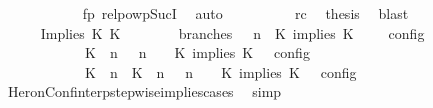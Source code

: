 \begin{isabellebody}
\ \ \ \ \ \ \ \ \ \ \isamarkupfalse%
\ fp\ relpowp{\isacharunderscore}Suc{\isacharunderscore}I{}\ \isamarkupfalse%
\ auto\isanewline
\ \ \ \ \ \ \ \ \isamarkupfalse%
\ rc\ \isamarkupfalse%
\ {\isacharquery}thesis\ \isamarkupfalse%
\ blast\isanewline
\ \ \ \ \ \ \isamarkupfalse%
\isanewline
\ \ \isamarkupfalse%
\isanewline
\ \ \ \ \isamarkupfalse%
\ {\isacharparenleft}Implies\ K\ K\isanewline
\ \ \ \ \ \ \isamarkupfalse%
\ branches{\isacharcolon}\ {\isacartoucheopen}{\isasymlbrakk}\ {\isasymGamma}{\isacharcomma}\ n\ {\isasymturnstile}\ {\isacharparenleft}{\isacharparenleft}K\ implies\ K\ {\isacharhash}\ {\isasymPsi}{\isacharparenright}\ {\isasymtriangleright}\ {\isasymPhi}\ {\isasymrbrakk}\isactrlsub c\isactrlsub o\isactrlsub n\isactrlsub f\isactrlsub i\isactrlsub g\isanewline
\ \ \ \ \ \ \ \ \ \ {\isacharequal}\ {\isasymlbrakk}\ {\isacharparenleft}{\isacharparenleft}K\ {\isasymnot}{\isasymUp}\ n{\isacharparenright}\ {\isacharhash}\ {\isasymGamma}{\isacharparenright}{\isacharcomma}\ n\ {\isasymturnstile}\ {\isasymPsi}\ {\isasymtriangleright}\ {\isacharparenleft}{\isacharparenleft}K\ implies\ K\ {\isacharhash}\ {\isasymPhi}{\isacharparenright}\ {\isasymrbrakk}\isactrlsub c\isactrlsub o\isactrlsub n\isactrlsub f\isactrlsub i\isactrlsub g\isanewline
\ \ \ \ \ \ \ \ \ \ {\isasymunion}\ {\isasymlbrakk}\ {\isacharparenleft}{\isacharparenleft}K\ {\isasymUp}\ n{\isacharparenright}\ {\isacharhash}\ {\isacharparenleft}K\ {\isasymUp}\ n{\isacharparenright}\ {\isacharhash}\ {\isasymGamma}{\isacharparenright}{\isacharcomma}\ n\ {\isasymturnstile}\ {\isasymPsi}\ {\isasymtriangleright}\ {\isacharparenleft}{\isacharparenleft}K\ implies\ K\ {\isacharhash}\ {\isasymPhi}{\isacharparenright}\ {\isasymrbrakk}\isactrlsub c\isactrlsub o\isactrlsub n\isactrlsub f\isactrlsub i\isactrlsub g{\isacartoucheclose}\isanewline
\ \ \ \ \ \ \ \ \isamarkupfalse%
\ HeronConf{\isacharunderscore}interp{\isacharunderscore}stepwise{\isacharunderscore}implies{\isacharunderscore}cases\ \isamarkupfalse%
\ simp\isanewline
\ \ \ \ \ \ \isamarkupfalse%

\end{isabellebody}
